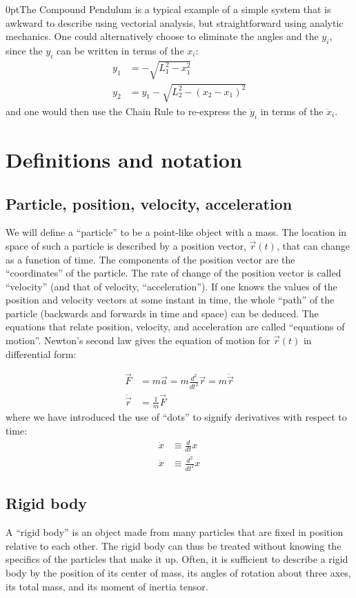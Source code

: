 \begin{example}{0pt}{The Compound Pendulum is a typical example of a simple system that is awkward to describe using vectorial analysis, but straightforward using analytic mechanics.}{}
One could alternatively choose to eliminate the angles and the $y_i$, since the $y_i$ can be written in terms of the $x_i$:
 \begin{align*}
 y_1&=-\sqrt{L_1^2-x_1^2}\\
 y_2&=y_1-\sqrt{L_2^2-(x_2-x_1)^2}
 \end{align*}
and one would then use the Chain Rule to re-express the $\ddot y_i$ in terms of the $\ddot x_i$.
\label{ex:vectorCompPend}
\end{example}


\section{Definitions and notation}
\subsection{Particle, position, velocity, acceleration}
We will define a ``particle'' to be a point-like object with a mass. The location in space of such a particle is described by a position vector, $\vec{r}(t)$, that can change as a function of time. The components of the position vector are the ``coordinates'' of the particle. The rate of change of the position vector is called ``velocity'' (and that of velocity, ``acceleration''). If one knows the values of the position and velocity vectors at some instant in time, the whole ``path'' of the particle (backwards and forwards in time and space) can be deduced. The equations that relate position, velocity, and acceleration are called ``equations of motion''. Newton's second law gives the equation of motion for $\vec{r}(t)$ in differential form:

\begin{align}
\vec{F}&=m\vec{a}=m\frac{d^2}{dt^2}\vec{r}=m\ddot{\vec{r}}\nonumber\\
\ddot{\vec{r}}&=\frac{1}{m}\vec{F}
\label{eqn:Fma2}
\end{align}
where we have introduced the use of ``dots'' to signify derivatives with respect to time:
\begin{align}
\dot{x}&\equiv\frac{d}{dt}x\nonumber\\
\ddot{x}&\equiv\frac{d^2}{dt^2}x
\label{eqn:defdot}
\end{align}

\subsection{Rigid body}
A ``rigid body'' is an object made from many particles that are fixed in position relative to each other. The rigid body can thus be treated without knowing the specifics of the particles that make it up. Often, it is sufficient to describe a rigid body by the position of its center of mass, its angles of rotation about three axes, its total mass, and its moment of inertia tensor.

